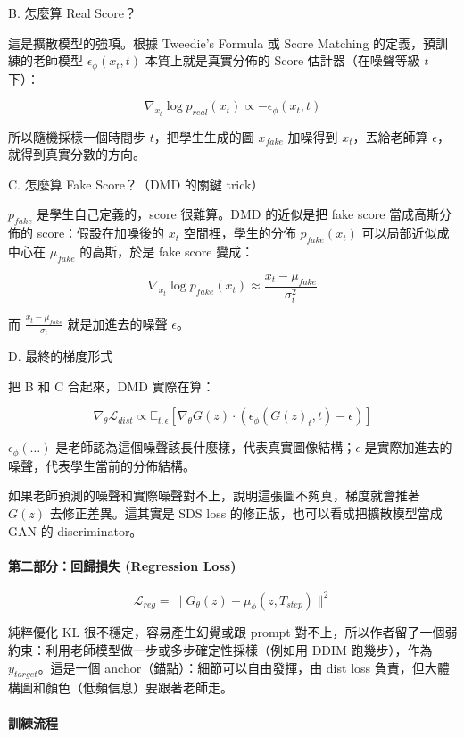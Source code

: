 B. 怎麼算 Real Score？

這是擴散模型的強項。根據 Tweedie's Formula 或 Score Matching 的定義，預訓練的老師模型 \(\epsilon_\phi(x_t, t)\) 本質上就是真實分佈的 Score 估計器（在噪聲等級 \(t\) 下）：

\[
\nabla_{x_t} \log p_{real}(x_t) \propto - \epsilon_\phi(x_t, t)
\]

所以隨機採樣一個時間步 \(t\)，把學生生成的圖 \(x_{fake}\) 加噪得到 \(x_t\)，丟給老師算 \(\epsilon\)，就得到真實分數的方向。

C. 怎麼算 Fake Score？（DMD 的關鍵 trick）

\(p_{fake}\) 是學生自己定義的，score 很難算。DMD 的近似是把 fake score 當成高斯分佈的 score：假設在加噪後的 \(x_t\) 空間裡，學生的分佈 \(p_{fake}(x_t)\) 可以局部近似成中心在 \(\mu_{fake}\) 的高斯，於是 fake score 變成：

\[
\nabla_{x_t} \log p_{fake}(x_t) \approx \frac{x_t - \mu_{fake}}{\sigma_t^2}
\]

而 \(\frac{x_t - \mu_{fake}}{\sigma_t}\) 就是加進去的噪聲 \(\epsilon\)。

D. 最終的梯度形式

把 B 和 C 合起來，DMD 實際在算：

\[
\nabla_\theta \mathcal{L}_{dist} \propto \mathbb{E}_{t, \epsilon} \left[ \nabla_\theta G(z) \cdot (\epsilon_\phi(G(z)_t, t) - \epsilon) \right]
\]

\(\epsilon_\phi(\dots)\) 是老師認為這個噪聲該長什麼樣，代表真實圖像結構；\(\epsilon\) 是實際加進去的噪聲，代表學生當前的分佈結構。

如果老師預測的噪聲和實際噪聲對不上，說明這張圖不夠真，梯度就會推著 \(G(z)\) 去修正差異。這其實是 SDS loss 的修正版，也可以看成把擴散模型當成 GAN 的 discriminator。

\paragraph{第二部分：回歸損失 (Regression Loss)}

\[
\mathcal{L}_{reg} = \| G_\theta(z) - \mu_\phi(z, T_{step}) \|^2
\]

純粹優化 KL 很不穩定，容易產生幻覺或跟 prompt 對不上，所以作者留了一個弱約束：利用老師模型做一步或多步確定性採樣（例如用 DDIM 跑幾步），作為 \(y_{target}\)。這是一個 anchor（錨點）：細節可以自由發揮，由 dist loss 負責，但大體構圖和顏色（低頻信息）要跟著老師走。

\paragraph{訓練流程}

